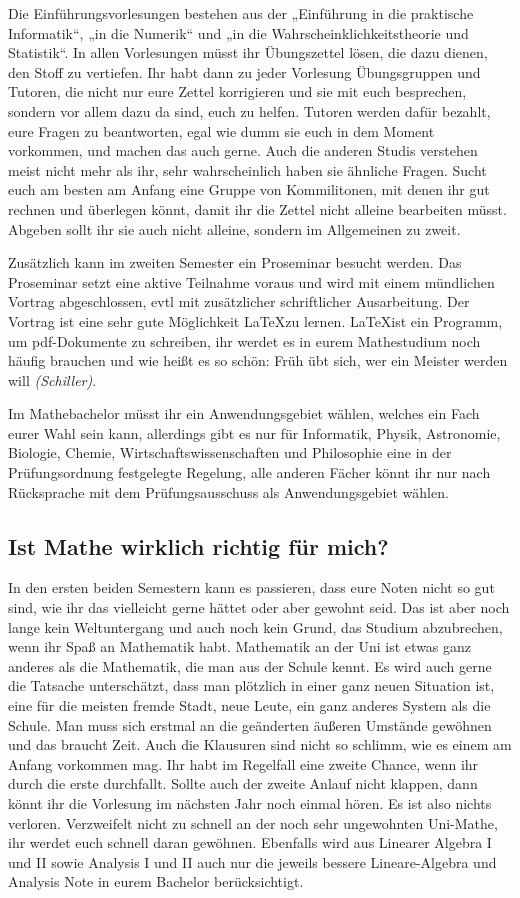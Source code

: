 Die Einführungsvorlesungen bestehen aus der „Einführung in die praktische Informatik“, „in die Numerik“ und „in die Wahrscheinklichkeitstheorie und Statistik“. In allen Vorlesungen müsst ihr Übungszettel lösen, die dazu dienen, den Stoff zu vertiefen. Ihr habt dann zu jeder Vorlesung Übungsgruppen und Tutoren, die nicht nur eure Zettel korrigieren und sie mit euch besprechen, sondern vor allem dazu da sind, euch zu helfen. Tutoren werden dafür bezahlt, eure Fragen zu beantworten, egal wie dumm sie euch in dem Moment vorkommen, und machen das auch gerne. Auch die anderen Studis verstehen meist nicht mehr als ihr, sehr wahrscheinlich haben sie ähnliche Fragen. Sucht euch am besten am Anfang eine Gruppe von Kommilitonen, mit denen ihr gut rechnen und überlegen könnt, damit ihr die Zettel nicht alleine bearbeiten müsst. Abgeben sollt ihr sie auch nicht alleine, sondern im Allgemeinen zu zweit.

Zusätzlich kann im zweiten Semester ein Proseminar besucht werden. Das Proseminar setzt eine aktive Teilnahme voraus und wird mit einem mündlichen Vortrag abgeschlossen, evtl mit zusätzlicher schriftlicher Ausarbeitung. Der Vortrag ist eine sehr gute Möglichkeit \LaTeX zu lernen. \LaTeX ist ein Programm, um pdf-Dokumente zu schreiben, ihr werdet es in eurem Mathestudium noch häufig brauchen und wie heißt es so schön: Früh übt sich, wer ein Meister werden will \textit{(Schiller)}.

Im Mathebachelor müsst ihr ein Anwendungsgebiet wählen, welches ein Fach eurer Wahl sein kann, allerdings gibt es nur für Informatik, Physik, Astronomie, Biologie, Chemie, Wirtschaftswissenschaften und Philosophie eine in der Prüfungsordnung festgelegte Regelung, alle anderen Fächer könnt ihr nur nach Rücksprache mit dem Prüfungsausschuss als Anwendungsgebiet wählen.

\subsection{Ist Mathe wirklich richtig für mich?}

In den ersten beiden Semestern kann es passieren, dass eure Noten nicht so gut sind, wie ihr das vielleicht gerne hättet oder aber gewohnt seid. Das ist aber noch lange kein Weltuntergang und auch noch kein Grund, das Studium abzubrechen, wenn ihr Spaß an Mathematik habt. Mathematik an der Uni ist etwas ganz anderes als die Mathematik, die man aus der Schule kennt. Es wird auch gerne die Tatsache unterschätzt, dass man plötzlich in einer ganz neuen Situation ist, eine für die meisten fremde Stadt, neue Leute, ein ganz anderes System als die Schule. Man muss sich erstmal an die geänderten äußeren Umstände gewöhnen und das braucht Zeit. Auch die Klausuren sind nicht so schlimm, wie es einem am Anfang vorkommen mag. Ihr habt im Regelfall eine zweite Chance, wenn ihr durch die erste durchfallt. Sollte auch der zweite Anlauf nicht klappen, dann könnt ihr die Vorlesung im nächsten Jahr noch einmal hören. Es ist also nichts verloren. Verzweifelt nicht zu schnell an der noch sehr ungewohnten Uni-Mathe, ihr werdet euch schnell daran gewöhnen. Ebenfalls wird aus Linearer Algebra I und II sowie Analysis I und II auch nur die jeweils bessere Lineare-Algebra und Analysis Note in eurem Bachelor berücksichtigt.

